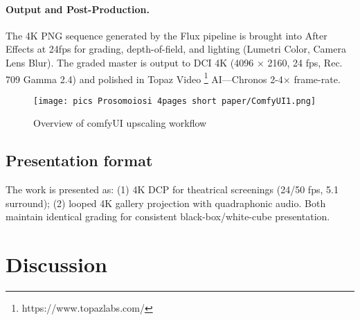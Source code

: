 \documentclass[sigconf,nonacm]{acmart}
\begin{document}

\paragraph{Output and Post-Production.}
The 4K PNG sequence generated by the Flux pipeline is brought into After Effects at 24fps for grading, depth-of-field, and lighting (Lumetri Color, Camera Lens Blur). The graded master is output to DCI 4K (4096 × 2160, 24 fps, Rec. 709 Gamma 2.4) and polished in Topaz Video \footnote{https://www.topazlabs.com/} AI—Chronos 2-4× frame-rate.

\begin{figure}[H]
    \centering
    \texttt{[image: pics Prosomoiosi 4pages short paper/ComfyUI1.png]}
    \caption{Overview of comfyUI upscaling workflow}
    \label{fig:enter-label}
\end{figure}

\subsection{Presentation format}
The work is presented as: (1) 4K DCP for theatrical screenings (24/50 fps, 5.1 surround); (2) looped 4K gallery projection with quadraphonic audio. Both maintain identical grading for consistent black-box/white-cube presentation.



\section{Discussion}
\end{document}
